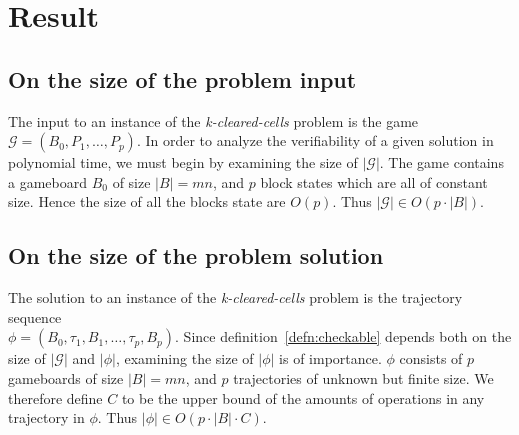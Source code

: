 \section{Result}

\subsection{On the size of the problem input}
The input to an instance of the \textit{k-cleared-cells} problem is the game $\mathcal{G} = (B_0, P_1, \ldots, P_p)$. In order to analyze the verifiability of a given solution in polynomial time, we must begin by examining the size of $|\mathcal{G}|$. The game contains a gameboard $B_0$ of size $|B| = mn$, and $p$ block states which are all of constant size. Hence the size of all the blocks state are $O(p)$. Thus $|\mathcal{G}| \in O(p \cdot |B|)$.

\subsection{On the size of the problem solution}
The solution to an instance of the \textit{k-cleared-cells} problem is the trajectory sequence \\ $\phi=(B_0, \tau_1, B_1, \ldots ,\tau_p, B_p)$. Since definition~\ref{defn:checkable} depends both on the size of $|\mathcal{G}|$ and $|\phi|$, examining the size of $|\phi|$ is of importance. $\phi$ consists of $p$ gameboards of size $|B| = mn$, and $p$ trajectories of unknown but finite size. We therefore define $C$ to be the upper bound of the amounts of operations in any trajectory in $\phi$. Thus $|\phi| \in O(p \cdot |B| \cdot C)$.





